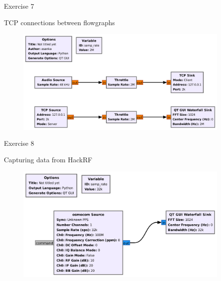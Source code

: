 \documentclass[handout]{beamer}
\begin{document}
\begin{frame}{Exercise 7}  

\footnotesize
TCP connections between flowgraphs

	\begin{figure}
		\includegraphics[width=300pt]{figures/Example-7.pdf}
	\end{figure}

\end{frame}


\begin{frame}{Exercise 8}  

\footnotesize
Capturing data from HackRF

	\begin{figure}
		\includegraphics[width=300pt]{figures/Example-8.pdf}
	\end{figure}

\end{frame}
\end{document}
